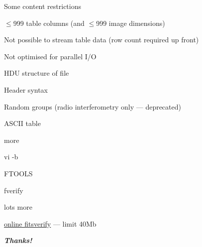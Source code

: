 \documentclass[20pt,landscape]{foils}
\newif\ifrubric
\newcommand{\bhref}[2]{\href{#1}{{\color{blue}#2}}}
\begin{document}
\begin{list1}
  \item Some content restrictions
\vspace*{-0.2cm}
  \begin{list2}
    \item $\le$999 table columns (and $\le$999 image dimensions)
\vspace*{-0.1cm}
    \item Not possible to stream table data (row count required up front)
\vspace*{-0.1cm}
    \item Not optimised for parallel I/O
\vspace*{-0.1cm}
  \end{list2}
\end{list1}


\begin{list2}
  \item HDU structure of file
  \item Header syntax
\end{list2}




\begin{list2}
  \item Random groups (radio interferometry only --- deprecated)
  \item ASCII table
\end{list2}


\begin{list2}
  \item more
  \item vi -b
  \item FTOOLS
  \begin{list3}
    \item fverify 
    \item lots more
  \end{list3}
  \item \bhref{https://fits.gsfc.nasa.gov/fits_verify.html}{online fitsverify}
        --- limit 40Mb
\end{list2}


\vspace{0.2cm}
\begin{center}
  {\color{darkred}\Huge\bf\sl Thanks!}
\end{center}

\label{lastPage}

\ifrubric

\newcommand{\aobSlide}[1]{
\newpage
\rightfooter{}
\MyLogo{}
\begin{picture}(30,0)
  #1
\end{picture}
\bigword{AOB?}
}
\aobSlide{}

\fi
\end{document}
